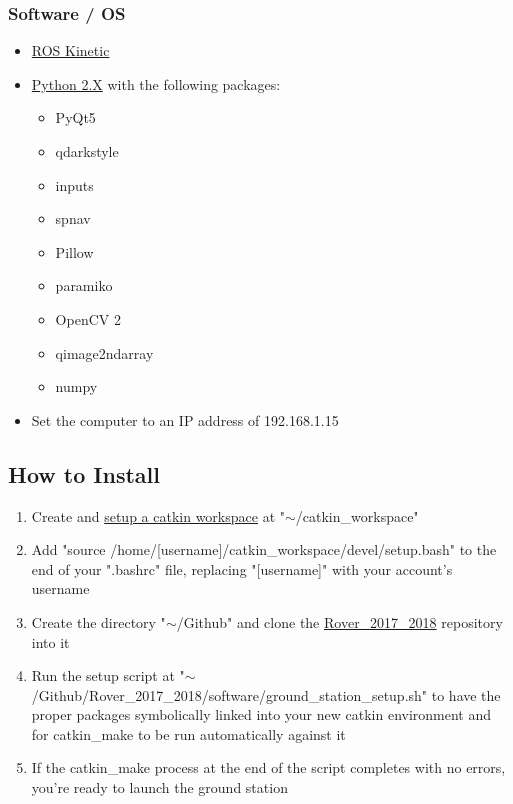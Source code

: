 \subsubsection{Software / OS}
\begin{itemize}
\item \href{http://wiki.ros.org/kinetic/Installation}{ROS Kinetic}
\item \href{https://www.python.org/}{Python 2.X} with the following packages:
	\begin{itemize}
	\item PyQt5
    \item qdarkstyle
    \item inputs
    \item spnav
    \item Pillow
    \item paramiko
    \item OpenCV 2
    \item qimage2ndarray
    \item numpy
	\end{itemize}
\item Set the computer to an IP address of 192.168.1.15
\end{itemize}


\subsection{How to Install}
\begin{enumerate}
\item Create and \href{http://wiki.ros.org/catkin/Tutorials/create_a_workspace}{setup a catkin workspace} at "$\sim$/catkin\_workspace"
\item Add "source /home/[username]/catkin\_workspace/devel/setup.bash" to the end of your ".bashrc" file, replacing "[username]" with your account's username
\item Create the directory "$\sim$/Github" and clone the \href{https://github.com/OSURoboticsClub/Rover_2017_2018}{Rover\_2017\_2018} repository into it
\item Run the setup script at "$\sim$/Github/Rover\_2017\_2018/software/ground\_station\_setup.sh" to have the proper packages symbolically linked into your new catkin environment and for catkin\_make to be run automatically against it
\item If the catkin\_make process at the end of the script completes with no errors, you're ready to launch the ground station
\end{enumerate}


